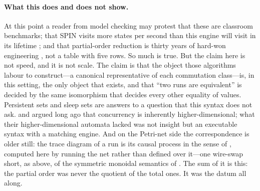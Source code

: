 \paragraph{What this does and does not show.}
At this point a reader from model checking may protest that these are
classroom benchmarks; that SPIN visits more states per second than this
engine will visit in its lifetime \parencite{holzmann_2003}; and that
partial-order reduction is thirty years of hard-won
engineering \parencite{godefroid_1996, flanagan_godefroid_2005}, not a
table with five rows. So much is true. But the claim here is not speed,
and it is not scale. The claim is that the object those algorithms
labour to construct---a canonical representative of each commutation
class---is, in this setting, the only object that exists, and that
``two runs are equivalent'' is decided by the same isomorphism that
decides every other equality of values. Persistent sets and sleep sets
are answers to a question that this syntax does not ask.
\textcite{pratt_1991} and \textcite{vanglabbeek_2006} argued long ago
that concurrency is inherently higher-dimensional; what their
higher-dimensional automata lacked was not insight but an executable
syntax with a matching engine. And on the Petri-net side the
correspondence is older still: the trace diagram of a run is its causal
process in the sense of \textcite{goltz_reisig_1983}, computed here by
running the net rather than defined over it---one wire-swap short, as
above, of the symmetric monoidal semantics of
\textcite{meseguer_montanari_1990}. The sum of it is this: the partial
order was never the quotient of the total ones. It was the datum all
along.

